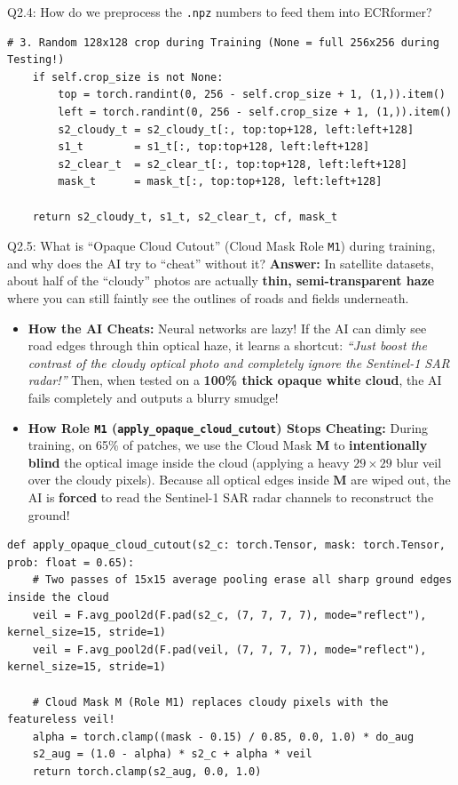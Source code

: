 \documentclass[11pt,a4paper]{article}
\begin{document}
\begin{qbox}{Q2.4: How do we preprocess the \texttt{.npz} numbers to feed them into ECRformer?}
\begin{lstlisting}[caption={Exact Data Loading \& Preprocessing Code (from \texttt{backend/data/cache\_dataset.py})}]
    # 3. Random 128x128 crop during Training (None = full 256x256 during Testing!)
    if self.crop_size is not None:
        top = torch.randint(0, 256 - self.crop_size + 1, (1,)).item()
        left = torch.randint(0, 256 - self.crop_size + 1, (1,)).item()
        s2_cloudy_t = s2_cloudy_t[:, top:top+128, left:left+128]
        s1_t        = s1_t[:, top:top+128, left:left+128]
        s2_clear_t  = s2_clear_t[:, top:top+128, left:left+128]
        mask_t      = mask_t[:, top:top+128, left:left+128]

    return s2_cloudy_t, s1_t, s2_clear_t, cf, mask_t
\end{lstlisting}
\end{qbox}

\begin{qbox}{Q2.5: What is ``Opaque Cloud Cutout'' (Cloud Mask Role \texttt{M1}) during training, and why does the AI try to ``cheat'' without it?}
\textbf{Answer:}
In satellite datasets, about half of the ``cloudy'' photos are actually \textbf{thin, semi-transparent haze} where you can still faintly see the outlines of roads and fields underneath.
\begin{itemize}[leftmargin=18pt]
    \item \textbf{How the AI Cheats:} Neural networks are lazy! If the AI can dimly see road edges through thin optical haze, it learns a shortcut: \textit{``Just boost the contrast of the cloudy optical photo and completely ignore the Sentinel-1 SAR radar!''} Then, when tested on a \textbf{100\% thick opaque white cloud}, the AI fails completely and outputs a blurry smudge!
    \item \textbf{How Role \texttt{M1} (\texttt{apply\_opaque\_cloud\_cutout}) Stops Cheating:} During training, on 65\% of patches, we use the Cloud Mask $\mathbf{M}$ to \textbf{intentionally blind} the optical image inside the cloud (applying a heavy $29\times 29$ blur veil over the cloudy pixels). Because all optical edges inside $\mathbf{M}$ are wiped out, the AI is \textbf{forced} to read the Sentinel-1 SAR radar channels to reconstruct the ground!
\end{itemize}

\begin{lstlisting}[caption={Opaque Cloud Cutout Anti-Cheating Augmentation (from \texttt{backend/losses/cloud\_structure\_loss.py})}]
def apply_opaque_cloud_cutout(s2_c: torch.Tensor, mask: torch.Tensor, prob: float = 0.65):
    # Two passes of 15x15 average pooling erase all sharp ground edges inside the cloud
    veil = F.avg_pool2d(F.pad(s2_c, (7, 7, 7, 7), mode="reflect"), kernel_size=15, stride=1)
    veil = F.avg_pool2d(F.pad(veil, (7, 7, 7, 7), mode="reflect"), kernel_size=15, stride=1)

    # Cloud Mask M (Role M1) replaces cloudy pixels with the featureless veil!
    alpha = torch.clamp((mask - 0.15) / 0.85, 0.0, 1.0) * do_aug
    s2_aug = (1.0 - alpha) * s2_c + alpha * veil
    return torch.clamp(s2_aug, 0.0, 1.0)
\end{lstlisting}
\end{qbox}
\end{document}
